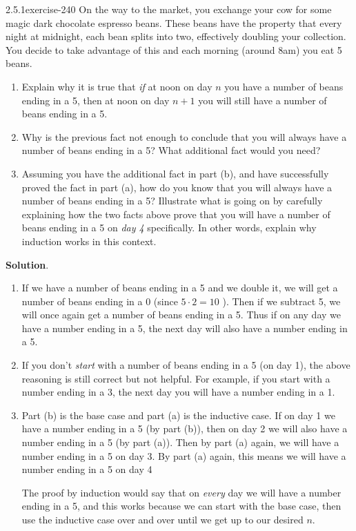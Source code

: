 \documentclass[twoside,11pt,]{book}
\numberwithin{equation}{chapter}
\begin{document}
\begin{divisionsolution}{2.5.1}{}{exercise-240}%
\hypertarget{p-3577}{}%
On the way to the market, you exchange your cow for some magic dark chocolate espresso beans. These beans have the property that every night at midnight, each bean splits into two, effectively doubling your collection. You decide to take advantage of this and each morning (around 8am) you eat 5 beans.\leavevmode%
\begin{enumerate}[label=(\alph*)]
\item\hypertarget{li-1972}{}\hypertarget{p-3578}{}%
Explain why it is true that \emph{if} at noon on day \(n\) you have a number of beans ending in a 5, then at noon on day \(n+1\) you will still have a number of beans ending in a 5.%
\item\hypertarget{li-1973}{}\hypertarget{p-3579}{}%
Why is the previous fact not enough to conclude that you will always have a number of beans ending in a 5? What additional fact would you need?%
\item\hypertarget{li-1974}{}\hypertarget{p-3580}{}%
Assuming you have the additional fact in part (b), and have successfully proved the fact in part (a), how do you know that you will always have a number of beans ending in a 5? Illustrate what is going on by carefully explaining how the two facts above prove that you will have a number of beans ending in a 5 on \emph{day 4} specifically. In other words, explain why induction works in this context.%
\end{enumerate}
%
\par\smallskip%
\noindent\textbf{Solution}.\quad%
\hypertarget{p-3581}{}%
\leavevmode%
\begin{enumerate}[label=(\alph*)]
\item\hypertarget{li-1975}{}\hypertarget{p-3582}{}%
If we have a number of beans ending in a 5 and we double it, we will get a number of beans ending in a 0 (since \(5\cdot 2 = 10\) ). Then if we subtract 5, we will once again get a number of beans ending in a 5. Thus if on any day we have a number ending in a 5, the next day will also have a number ending in a 5.%
\item\hypertarget{li-1976}{}\hypertarget{p-3583}{}%
If you don't \emph{start} with a number of beans ending in a 5 (on day 1), the above reasoning is still correct but not helpful. For example, if you start with a number ending in a 3, the next day you will have a number ending in a 1.%
\item\hypertarget{li-1977}{}\hypertarget{p-3584}{}%
Part (b) is the base case and part (a) is the inductive case. If on day 1 we have a number ending in a 5 (by part (b)), then on day 2 we will also have a number ending in a 5 (by part (a)). Then by part (a) again, we will have a number ending in a 5 on day 3. By part (a) again, this means we will have a number ending in a 5 on day 4%
\par
\hypertarget{p-3585}{}%
The proof by induction would say that on \emph{every} day we will have a number ending in a 5, and this works because we can start with the base case, then use the inductive case over and over until we get up to our desired \(n\).%
\end{enumerate}
%
\end{divisionsolution}%
\end{document}
